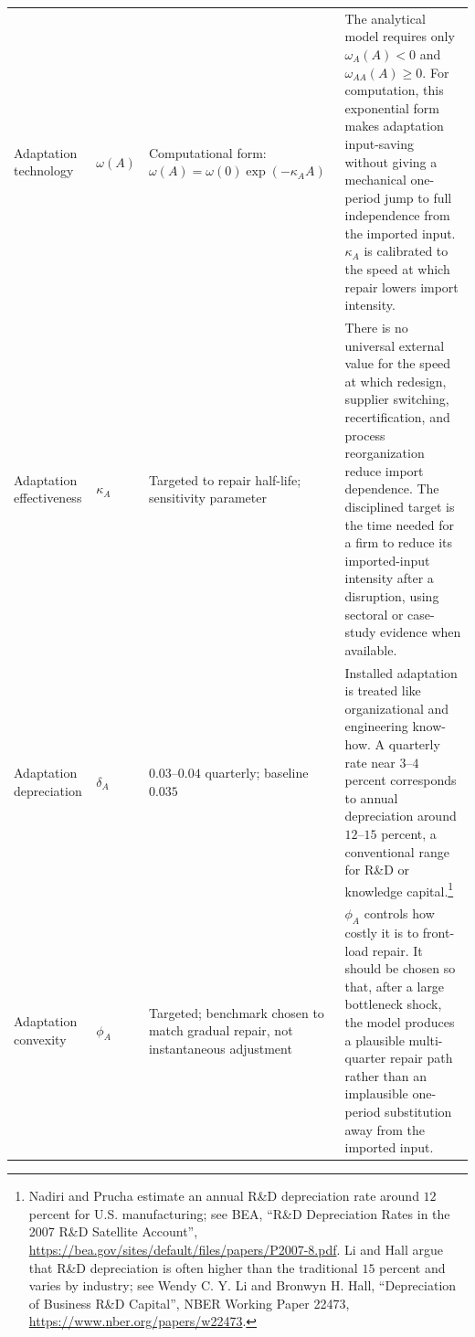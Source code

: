 ﻿\documentclass[12pt]{article}
\theoremstyle{remark}
\begin{document}
\begin{longtable}{
>{\raggedright\arraybackslash}p{}
>{\raggedright\arraybackslash}p{}
>{\raggedright\arraybackslash}p{}
>{\raggedright\arraybackslash}p{}}
Adaptation technology
&
$\omega(A)$
&
Computational form:
$\omega(A)=\omega(0)\exp(-\kappa_AA)$
&
The analytical model requires only $\omega_A(A)<0$ and $\omega_{AA}(A)\ge0$. For computation, this
exponential form makes adaptation input-saving without giving a mechanical one-period jump to full
independence from the imported input. $\kappa_A$ is calibrated to the speed at which repair lowers
import intensity.
\\

Adaptation effectiveness
&
$\kappa_A$
&
Targeted to repair half-life; sensitivity parameter
&
There is no universal external value for the speed at which redesign, supplier switching,
recertification, and process reorganization reduce import dependence. The disciplined target is the
time needed for a firm to reduce its imported-input intensity after a disruption, using sectoral or
case-study evidence when available.
\\

Adaptation depreciation
&
$\delta_A$
&
$0.03$--$0.04$ quarterly; baseline $0.035$
&
Installed adaptation is treated like organizational and engineering know-how. A quarterly rate near
$3$--$4$ percent corresponds to annual depreciation around $12$--$15$ percent, a conventional range
for R\&D or knowledge capital.\footnote{Nadiri and Prucha estimate an annual R\&D depreciation rate
around $12$ percent for U.S. manufacturing; see BEA, ``R\&D Depreciation Rates in the 2007 R\&D
Satellite Account'', \url{https://bea.gov/sites/default/files/papers/P2007-8.pdf}. Li and Hall
argue that R\&D depreciation is often higher than the traditional $15$ percent and varies by
industry; see Wendy C. Y. Li and Bronwyn H. Hall, ``Depreciation of Business R\&D Capital'', NBER
Working Paper 22473, \url{https://www.nber.org/papers/w22473}.}
\\

Adaptation convexity
&
$\phi_A$
&
Targeted; benchmark chosen to match gradual repair, not instantaneous adjustment
&
$\phi_A$ controls how costly it is to front-load repair. It should be chosen so that, after a
large bottleneck shock, the model produces a plausible multi-quarter repair path rather than an
implausible one-period substitution away from the imported input.
\\


\end{longtable}
\end{document}
